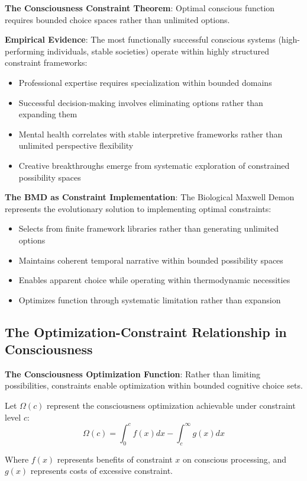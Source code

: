\documentclass[12pt]{article}
\begin{document}
\textbf{The Consciousness Constraint Theorem}: Optimal conscious function requires bounded choice spaces rather than unlimited options.

\textbf{Empirical Evidence}: The most functionally successful conscious systems (high-performing individuals, stable societies) operate within highly structured constraint frameworks:
\begin{itemize}
\item Professional expertise requires specialization within bounded domains
\item Successful decision-making involves eliminating options rather than expanding them
\item Mental health correlates with stable interpretive frameworks rather than unlimited perspective flexibility
\item Creative breakthroughs emerge from systematic exploration of constrained possibility spaces
\end{itemize}

\textbf{The BMD as Constraint Implementation}: The Biological Maxwell Demon represents the evolutionary solution to implementing optimal constraints:
\begin{itemize}
\item Selects from finite framework libraries rather than generating unlimited options
\item Maintains coherent temporal narrative within bounded possibility spaces
\item Enables apparent choice while operating within thermodynamic necessities
\item Optimizes function through systematic limitation rather than expansion
\end{itemize}

\subsection{The Optimization-Constraint Relationship in Consciousness}

\textbf{The Consciousness Optimization Function}: Rather than limiting possibilities, constraints enable optimization within bounded cognitive choice sets.

Let $\Omega(c)$ represent the consciousness optimization achievable under constraint level $c$:
$$\Omega(c) = \int_0^c f(x)dx - \int_c^{\infty} g(x)dx$$

Where $f(x)$ represents benefits of constraint $x$ on conscious processing, and $g(x)$ represents costs of excessive constraint.
\end{document}
